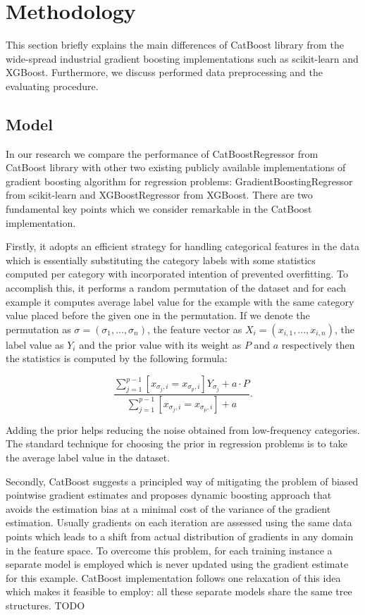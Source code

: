 \section{Methodology}
\label{sec:methodology}

This section briefly explains the main differences of CatBoost library from the wide-spread industrial gradient boosting implementations such as scikit-learn and XGBoost. Furthermore, we discuss performed data preprocessing and the evaluating procedure.

\subsection{Model}

In our research we compare the performance of CatBoostRegressor from CatBoost library with other two existing publicly available implementations of gradient boosting algorithm for regression problems: GradientBoostingRegressor from scikit-learn and XGBoostRegressor from XGBoost. There are two fundamental key points which we consider remarkable in the CatBoost implementation.

Firstly, it adopts an efficient strategy for handling categorical features in the data which is essentially substituting the category labels with some statistics computed per category with incorporated intention of prevented overfitting. To accomplish this, it performs a random permutation of the dataset and for each example it computes average label value for the example with the same category value placed before the given one in the permutation. 
If we denote the permutation as $ \sigma = (\sigma_1, ..., \sigma_n)$, the feature vector as $ X_i = (x_{i, 1}, ..., x_{i, n})$, the label value as $Y_i$ and the prior value with its weight as $P$ and $a$ respectively then the statistics is computed by the following formula:

$$ \frac{\sum_{j=1}^{p-1} [ x_{\sigma_j, i} = x_{\sigma_p, i}] Y_{\sigma_j} + a \cdot P}{\sum_{j=1}^{p-1} [ x_{\sigma_j, i} = x_{\sigma_p, i}] + a }. $$

Adding the prior helps reducing the noise obtained from low-frequency categories. The standard technique for choosing the prior in regression problems is to take the average label value in the dataset.

Secondly, CatBoost suggests a principled way of mitigating the problem of biased pointwise gradient estimates and proposes dynamic boosting approach that avoids the estimation bias at a minimal cost of the variance of the gradient estimation. Usually gradients on each iteration are assessed using the same data points which leads to a shift from actual distribution of gradients in any domain in the feature space. To overcome this problem, for each training instance a separate model is employed which is never updated using the gradient estimate for this example. CatBoost implementation follows one relaxation of this idea which makes it feasible to employ: all these separate models share the same tree structures. TODO

